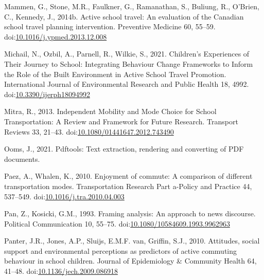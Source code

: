 \documentclass[]{elsarticle} %
\newlength{\cslhangindent}
\newlength{\cslentryspacingunit} %
\newenvironment{CSLReferences}[2] %
 {%
  \setlength{\parindent}{0pt}
  \ifodd #1
  \let\oldpar\par
  \def\par{\hangindent=\cslhangindent\oldpar}
  \fi
  \setlength{\parskip}{#2\cslentryspacingunit}
 }%
 {}
\begin{document}
\begin{CSLReferences}{1}{0}
\leavevmode{}%
Mammen, G., Stone, M.R., Faulkner, G., Ramanathan, S., Buliung, R.,
O'Brien, C., Kennedy, J., 2014b. Active school travel: An evaluation of
the {Canadian} school travel planning intervention. Preventive Medicine
60, 55--59.
doi:\href{https://doi.org/10.1016/j.ypmed.2013.12.008}{10.1016/j.ypmed.2013.12.008}

\leavevmode{}%
Michail, N., Ozbil, A., Parnell, R., Wilkie, S., 2021. Children's
{Experiences} of {Their Journey} to {School}: Integrating {Behaviour
Change Frameworks} to {Inform} the {Role} of the {Built Environment} in
{Active School Travel Promotion}. International Journal of Environmental
Research and Public Health 18, 4992.
doi:\href{https://doi.org/10.3390/ijerph18094992}{10.3390/ijerph18094992}

\leavevmode{}%
Mitra, R., 2013. Independent {Mobility} and {Mode Choice} for {School
Transportation}: A {Review} and {Framework} for {Future Research}.
Transport Reviews 33, 21--43.
doi:\href{https://doi.org/10.1080/01441647.2012.743490}{10.1080/01441647.2012.743490}

\leavevmode{}%
Ooms, J., 2021. Pdftools: Text extraction, rendering and converting of
PDF documents.

\leavevmode{}%
Paez, A., Whalen, K., 2010. Enjoyment of commute: A comparison of
different transportation modes. Transportation Research Part a-Policy
and Practice 44, 537--549.
doi:\href{https://doi.org/10.1016/j.tra.2010.04.003}{10.1016/j.tra.2010.04.003}

\leavevmode{}%
Pan, Z., Kosicki, G.M., 1993. Framing analysis: An approach to news
discourse. Political Communication 10, 55--75.
doi:\href{https://doi.org/10.1080/10584609.1993.9962963}{10.1080/10584609.1993.9962963}

\leavevmode{}%
Panter, J.R., Jones, A.P., Sluijs, E.M.F. van, Griffin, S.J., 2010.
Attitudes, social support and environmental perceptions as predictors of
active commuting behaviour in school children. Journal of Epidemiology
\& Community Health 64, 41--48.
doi:\href{https://doi.org/10.1136/jech.2009.086918}{10.1136/jech.2009.086918}


\end{CSLReferences}
\end{document}
